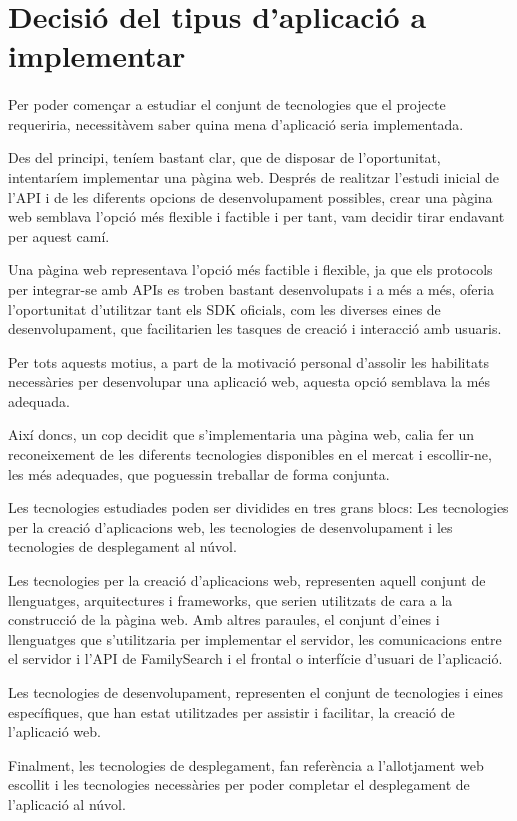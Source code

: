\section{Decisió del tipus d'aplicació a implementar}

    \paragraph{}
    Per poder començar a estudiar el conjunt de tecnologies que el projecte requeriria, necessitàvem saber quina mena d'aplicació seria implementada.

    Des del principi, teníem bastant clar, que de disposar de l’oportunitat, intentaríem implementar una pàgina web. Després de realitzar l’estudi inicial de l’API i de les diferents opcions de desenvolupament possibles, crear una pàgina web semblava l’opció més flexible i factible i per tant, vam decidir tirar endavant per aquest camí.

    Una pàgina web representava l’opció més factible i flexible, ja que els protocols per integrar-se amb APIs es troben bastant desenvolupats i a més a més, oferia l’oportunitat d’utilitzar tant els SDK oficials, com les diverses eines de desenvolupament, que facilitarien les tasques de creació i interacció amb usuaris.

    Per tots aquests motius, a part de la motivació personal d’assolir les habilitats necessàries per desenvolupar una aplicació web, aquesta opció semblava la més adequada.

    Així doncs, un cop decidit que s'implementaria una pàgina web, calia fer un reconeixement de les diferents tecnologies disponibles en el mercat i escollir-ne, les més adequades, que poguessin treballar de forma conjunta.

    Les tecnologies estudiades poden ser dividides en tres grans blocs: Les tecnologies per la creació d’aplicacions web, les tecnologies de desenvolupament i les tecnologies de desplegament al núvol.

    Les tecnologies per la creació d’aplicacions web, representen aquell conjunt de llenguatges, arquitectures i frameworks, que serien utilitzats de cara a la construcció de la pàgina web. Amb altres paraules, el conjunt d’eines i llenguatges que s’utilitzaria per implementar el servidor, les comunicacions entre el servidor i l’API de FamilySearch i el frontal o interfície d'usuari de l’aplicació.

    Les tecnologies de desenvolupament, representen el conjunt de tecnologies i eines específiques, que han estat utilitzades per assistir i facilitar, la creació de l’aplicació web.

    Finalment, les tecnologies de desplegament, fan referència a l'allotjament web escollit i les tecnologies necessàries per poder completar el desplegament de l’aplicació al núvol.
